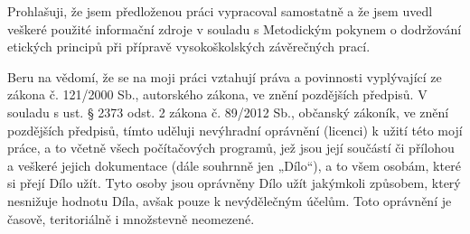\documentclass[czech,master,unicode]{template/ctufit-thesis}
\theoremstyle{plain}
\theoremstyle{definition}
\theoremstyle{remark}
\numberwithin{theorem}{chapter}
\begin{document}
\begin{declarationpage}
    Prohlašuji, že jsem předloženou práci vypracoval samostatně a že jsem uvedl veškeré
    použité informační zdroje v souladu s Metodickým pokynem o dodržování etických
    principů při přípravě vysokoškolských závěrečných prací.

    Beru na vědomí, že se na moji práci vztahují práva a povinnosti vyplývající ze zákona
    č. 121/2000 Sb., autorského zákona, ve znění pozdějších předpisů. V souladu s ust.
    § 2373 odst. 2 zákona č. 89/2012 Sb., občanský zákoník, ve znění pozdějších předpisů,
    tímto uděluji nevýhradní oprávnění (licenci) k užití této mojí práce, a to včetně všech
    počítačových programů, jež jsou její součástí či přílohou a veškeré jejich
    dokumentace (dále souhrnně jen „Dílo“), a to všem osobám, které si přejí Dílo užít.
    Tyto osoby jsou oprávněny Dílo užít jakýmkoli způsobem, který nesnižuje hodnotu
    Díla, avšak pouze k nevýdělečným účelům. Toto oprávnění je časově, teritoriálně
    i množstevně neomezené.
\end{declarationpage}

\printabstractpage %

%
%
%
%
%
%
%
%
%
\end{document}
